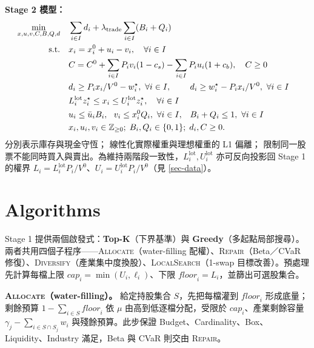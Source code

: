 \documentclass[11pt,a4paper]{article}
\begin{document}
\textbf{Stage 2 模型：}
\begin{align}
\min_{x, u, v, C, B, Q, d}\quad & \sum_{i \in I} d_i + \lambda_{\text{trade}} \sum_{i \in I} (B_i + Q_i) \label{obj2}\\
\text{s.t.}\quad & x_i = x_i^0 + u_i - v_i, \quad \forall i \in I \label{c2:inv}\\
& \mathrlap{C = C^0 + \sum_{i \in I} P_i v_i (1-c_s) - \sum_{i \in I} P_i u_i (1+c_b), \quad C \geq 0} \label{c2:cash}\\
& d_i \geq P_i x_i / V^0 - w_i^\star,\ \forall i \in I, & & d_i \geq w_i^\star - P_i x_i / V^0,\ \forall i \in I \label{c2:dev}\\
& \mathrlap{L_i^{\text{lot}} z_i^\star \leq x_i \leq U_i^{\text{lot}} z_i^\star, \quad \forall i \in I} \label{c2:lot}\\
& u_i \leq \bar{u}_i B_i,\ \ v_i \leq x_i^0 Q_i,\ \forall i \in I, & & B_i + Q_i \leq 1,\ \forall i \in I \label{c2:mutex}\\
& \mathrlap{x_i, u_i, v_i \in \mathbb{Z}_{\geq 0}; \; B_i, Q_i \in \{0,1\};\; d_i, C \geq 0.} \nonumber
\end{align}
 分別表示庫存與現金守恆； 線性化實際權重與理想權重的 L1 偏離； 限制同一股票不能同時買入與賣出。為維持兩階段一致性，$L_i^{\text{lot}}, U_i^{\text{lot}}$ 亦可反向投影回 Stage 1 的權界 $L_i = L_i^{\text{lot}} P_i / V^0$、$U_i = U_i^{\text{lot}} P_i / V^0$（見 \cref{sec-data}）。



\section{Algorithms}
\label{sec-algo}

Stage 1 提供兩個啟發式：\textbf{Top-K}（下界基準）與 \textbf{Greedy}（多起點局部搜尋）。兩者共用四個子程序——\textsc{Allocate}（water-filling 配權）、\textsc{Repair}（Beta／CVaR 修復）、\textsc{Diversify}（產業集中度換股）、\textsc{LocalSearch}（1-swap 目標改善）。預處理先計算每檔上限 $\mathit{cap}_i=\min(U_i,\ell_i)$、下限 $\mathit{floor}_i=L_i$，並篩出可選股集合。

\textbf{\textsc{Allocate}（water-filling）。}{} 給定持股集合 $S$，先把每檔灌到 $\mathit{floor}_i$ 形成底量；剩餘預算 $1-\sum_{i\in S}\mathit{floor}_i$ 依 $\mu$ 由高到低逐檔分配，受限於 $\mathit{cap}_i$、產業剩餘容量 $\gamma_j-\sum_{i\in S\cap S_j}w_i$ 與殘餘預算。此步保證 Budget、Cardinality、Box、Liquidity、Industry 滿足，Beta 與 CVaR 則交由 \textsc{Repair}。
\end{document}
